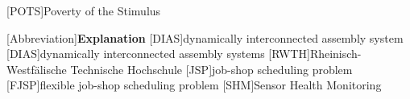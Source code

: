 \usepackage{acronym}[POTS]{Poverty of the Stimulus}


\begin{acronym}[Abbreviation]
 [Abbreviation]{\textbf{Explanation}} 
 [DIAS]{dynamically interconnected assembly system}
 [DIAS]{dynamically interconnected assembly systems}
 [RWTH]{Rheinisch-Westfälische Technische Hochschule}
 [JSP]{job-shop scheduling problem}
 [FJSP]{flexible job-shop scheduling problem}
 [SHM]{Sensor Health Monitoring}
\end{acronym}
